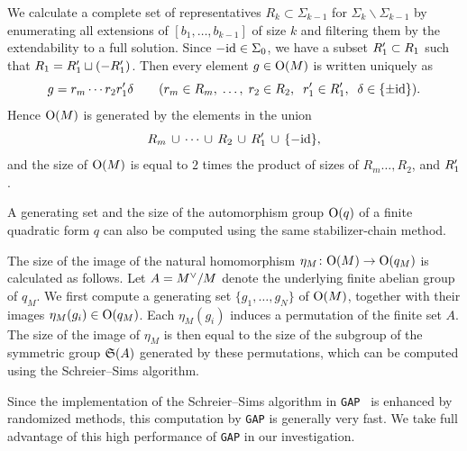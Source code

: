 \documentclass{amsart} %
\begin{document}
We calculate a complete set of representatives
$R_k \subset \Sigma_{k-1}$ for $\Sigma_{k}\backslash\Sigma_{k-1}$
by enumerating all extensions of $[b_1, \dots, b_{k-1}]$ of size $k$
and filtering them by the extendability to a full solution.
Since $-\mathord{\mathrm{id}}\in \Sigma_0$,
we have a subset $R_1^{\prime} \subset R_1$ such that
$R_1=R_1^{\prime}\sqcup (-R_1^{\prime})$.
Then every element $g\in \mathord{\mathrm{O}}(M)$ 
is written uniquely as 
\[
g=r_m \cdots r_2 r_1^{\prime} \delta \qquad
 (r_m\in R_m,\; \dots, \; r_2\in R_2, \;\; r_1^{\prime}\in R_1^{\prime},\;\; \delta\in \{\pm \mathord{\mathrm{id}}\}).
\]
Hence $\mathord{\mathrm{O}}(M)$ is generated by the elements in the union 
\[
R_m\, \cup\, \cdots\, \cup \,R_2\,\cup\, R_1^{\prime}\,\cup\, \{- \mathord{\mathrm{id}}\},
\]
and 
the size of $\mathord{\mathrm{O}}(M)$ is equal to $2$ times the product of sizes of $R_m\dots, R_2$, and $R_1^{\prime}$.
\par
A generating set and the size of the automorphism group $\mathord{\mathrm{O}}(q)$ of a finite quadratic form 
$q$ can also be computed using the same stabilizer-chain method.
\par
The size of the image of 
the natural homomorphism $\eta_M\colon \mathord{\mathrm{O}}(M)\to \mathord{\mathrm{O}}(q_M)$ is calculated as follows.
Let $A=M^{\vee}/M$ denote the underlying finite abelian group of $q_M$.
We first compute a generating set $\{g_1, \dots, g_N\}$ of $\mathord{\mathrm{O}}(M)$,
together with their images $\eta_M(g_i)\in \mathord{\mathrm{O}}(q_M)$.
Each $\eta_M(g_i)$ induces a permutation of the finite set $A$.
The size of the image of $\eta_M$ is 
then equal to the size of the subgroup of 
the symmetric group $\mathord{\mathfrak{S}}(A)$ generated by these permutations,
which can be computed using the Schreier--Sims algorithm.
%
\begin{remark}\label{rem:GAPadvantage}
Since the implementation of the Schreier--Sims algorithm in {\tt GAP}~\cite{GAP4} is enhanced by randomized methods,
this computation  by {\tt GAP} is generally very fast.
We take full advantage of this high performance of {\tt GAP} in our investigation.
\end{remark}
%
\end{document}
